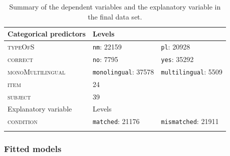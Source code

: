 \begin{table}\fontsize{10}{11}
\caption{Summary of the dependent variables and the explanatory variable in the final data set.}
\label{tab:7.6}
\centering
\begin{tabular}{lllll} 
\lsptoprule
Categorical predictors & Levels & ~                               & ~ & ~                                     \\ 
\midrule
\textsc{typeOfS}                & \multicolumn{2}{l}{\texttt{nm}: 22159}            & \multicolumn{2}{l}{\texttt{pl}:
  20928}           \\
\textsc{correct}                & \multicolumn{2}{l}{\texttt{no}: 7795}             & \multicolumn{2}{l}{\texttt{yes}: 35292}            \\
\textsc{monoMultilingual}       & \multicolumn{2}{l}{\texttt{monolingual}:
  37578} & \multicolumn{2}{l}{\texttt{multilingual}:
  5509}  \\
\textsc{item}                   & 24     & ~                               & ~ & ~                                     \\
\textsc{subject}                & 39     & ~                               & ~ & ~                                     \\ 
\midrule
Explanatory variable   & Levels & ~                               & ~ & ~                                     \\ 
\midrule
\textsc{condition}              & \multicolumn{2}{l}{\texttt{matched}:
  21176}     & \multicolumn{2}{l}{\texttt{mismatched}:
  21911}   \\
\lspbottomrule
\end{tabular}
\end{table}

\subsubsection{Fitted models}\label{section07_2_2_2}

